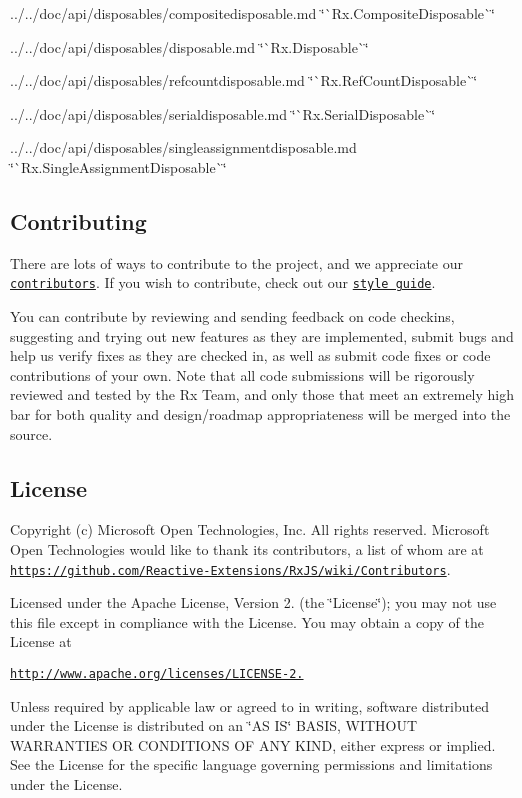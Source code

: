 \begin{DoxyItemize}
\item ../../doc/api/disposables/compositedisposable.md \char`\"{}\`{}\+Rx.\+Composite\+Disposable\`{}\char`\"{}
\item ../../doc/api/disposables/disposable.md \char`\"{}\`{}\+Rx.\+Disposable\`{}\char`\"{}
\item ../../doc/api/disposables/refcountdisposable.md \char`\"{}\`{}\+Rx.\+Ref\+Count\+Disposable\`{}\char`\"{}
\item ../../doc/api/disposables/serialdisposable.md \char`\"{}\`{}\+Rx.\+Serial\+Disposable\`{}\char`\"{}
\item ../../doc/api/disposables/singleassignmentdisposable.md \char`\"{}\`{}\+Rx.\+Single\+Assignment\+Disposable\`{}\char`\"{}
\end{DoxyItemize}

\subsection*{Contributing}

There are lots of ways to contribute to the project, and we appreciate our \href{https://github.com/Reactive-Extensions/RxJS/wiki/Contributors}{\tt contributors}. If you wish to contribute, check out our \href{(https://github.com/Reactive-Extensions/RxJS/tree/master/doc/contributing)}{\tt style guide}.

You can contribute by reviewing and sending feedback on code checkins, suggesting and trying out new features as they are implemented, submit bugs and help us verify fixes as they are checked in, as well as submit code fixes or code contributions of your own. Note that all code submissions will be rigorously reviewed and tested by the Rx Team, and only those that meet an extremely high bar for both quality and design/roadmap appropriateness will be merged into the source.

\subsection*{License}

Copyright (c) Microsoft Open Technologies, Inc. All rights reserved. Microsoft Open Technologies would like to thank its contributors, a list of whom are at \href{https://github.com/Reactive-Extensions/RxJS/wiki/Contributors}{\tt https\+://github.\+com/\+Reactive-\/\+Extensions/\+Rx\+J\+S/wiki/\+Contributors}.

Licensed under the Apache License, Version 2. (the \char`\"{}\+License\char`\"{}); you may not use this file except in compliance with the License. You may obtain a copy of the License at

\href{http://www.apache.org/licenses/LICENSE-2.0}{\tt http\+://www.\+apache.\+org/licenses/\+L\+I\+C\+E\+N\+S\+E-\/2.}

Unless required by applicable law or agreed to in writing, software distributed under the License is distributed on an \char`\"{}\+A\+S I\+S\char`\"{} B\+A\+S\+IS, W\+I\+T\+H\+O\+UT W\+A\+R\+R\+A\+N\+T\+I\+ES OR C\+O\+N\+D\+I\+T\+I\+O\+NS OF A\+NY K\+I\+ND, either express or implied. See the License for the specific language governing permissions and limitations under the License. 